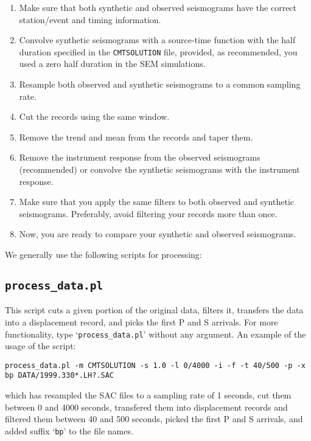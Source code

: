 \begin{enumerate}
\item Make sure that both synthetic and observed seismograms have the correct station/event and timing information.
\item Convolve synthetic seismograms with a source-time function with the half duration specified in the \texttt{CMTSOLUTION} file, provided, as recommended, you used a zero half duration in the SEM simulations.
\item Resample both observed and synthetic seismograms to a common sampling rate.
\item Cut the records using the same window.
\item Remove the trend and mean from the records and taper them.
\item Remove the instrument response from the observed seismograms (recommended) or convolve the synthetic seismograms with the instrument response.
\item Make sure that you apply the same filters to both observed and synthetic seismograms. Preferably, avoid filtering your records more than once.
\item Now, you are ready to compare your synthetic and observed seismograms.
\end{enumerate}

We generally use the following scripts for processing:

\subsection{\texttt{process\_data.pl}}

This script cuts a given portion of the original data, filters it,
transfers the data into a displacement record, and picks the first
P and S arrivals. For more functionality, type `\texttt{process\_data.pl}'
without any argument. An example of the usage of the script:

{\footnotesize
\begin{verbatim}
process_data.pl -m CMTSOLUTION -s 1.0 -l 0/4000 -i -f -t 40/500 -p -x bp DATA/1999.330*.LH?.SAC
\end{verbatim}
}

\noindent
which has resampled the SAC files to a sampling rate of 1 seconds, cut them between 0 and 4000 seconds, transfered them into displacement
records and filtered them between 40 and 500 seconds, picked the first P and S arrivals, and added suffix `\texttt{bp}' to the file names.\newline


